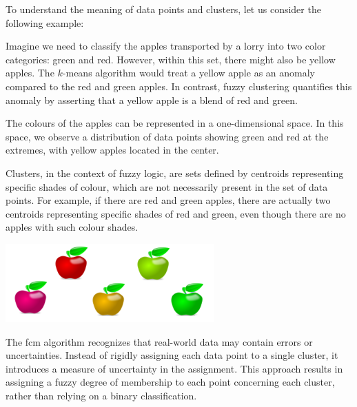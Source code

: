 \begin{exempli_gratia}
To understand the meaning of data points and clusters, let us consider the following example:

\noindent Imagine we need to classify the apples transported by a lorry into two color categories: green and red. However, within this set, there might also be yellow apples. The $k$-means algorithm would treat a yellow apple as an anomaly compared to the red and green apples. In contrast, fuzzy clustering quantifies this anomaly by asserting that a yellow apple is a blend of red and green.

\noindent The colours of the apples can be represented in a one-dimensional space. In this space, we observe a distribution of data points showing green and red at the extremes, with yellow apples located in the center.

\noindent Clusters, in the context of fuzzy logic, are sets defined by centroids representing specific shades of colour, which are not necessarily present in the set of data points. For example, if there are red and green apples, there are actually two centroids representing specific shades of red and green, even though there are no apples with such colour shades.

\begin{center}
	\includegraphics[width=0.5\linewidth]{Figures/apple.png}
\end{center}
\end{exempli_gratia}

\begin{remark}
	The \gls{fcm} algorithm recognizes that real-world data may contain errors or uncertainties. Instead of rigidly assigning each data point to a single cluster, it introduces a measure of uncertainty in the assignment. This approach results in assigning a fuzzy degree of membership to each point concerning each cluster, rather than relying on a binary classification.
\end{remark}

